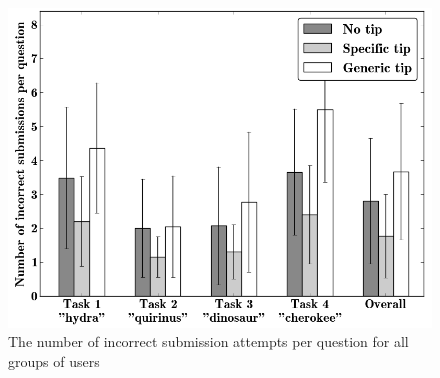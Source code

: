 \documentclass{sig-alternate}
\begin{document}
\begin{figure}[H]
\centering
\includegraphics[scale=0.35]{img/incorrect}
\caption{The number of incorrect submission attempts per question for all groups of users}
\label{figure:incorrect}
\end{figure}
\end{document}
